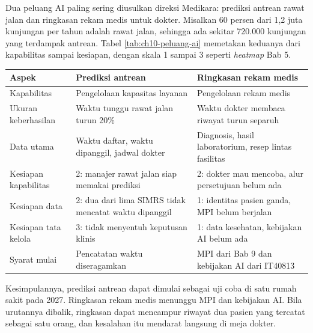 \begin{kasus}[title={Kasus Medikara Health: Dua Peluang AI}]
Dua peluang AI paling sering diusulkan direksi Medikara: prediksi antrean
rawat jalan dan ringkasan rekam medis untuk dokter. Misalkan 60 persen dari
1,2 juta kunjungan per tahun adalah rawat jalan, sehingga ada sekitar 720.000
kunjungan yang terdampak antrean. Tabel \ref{tab:ch10-peluang-ai} memetakan
keduanya dari kapabilitas sampai kesiapan, dengan skala 1 sampai 3 seperti
\textit{heatmap} Bab 5.

\begin{center}
  \small
  \label{tab:ch10-peluang-ai}
  \begin{tabularx}{\linewidth}{lXX}
    \hline
    \textbf{Aspek} & \textbf{Prediksi antrean} & \textbf{Ringkasan rekam medis} \\
    \hline
    Kapabilitas & Pengelolaan kapasitas layanan & Pengelolaan rekam medis \\
    \hline
    Ukuran keberhasilan & Waktu tunggu rawat jalan turun 20\% & Waktu dokter membaca riwayat turun separuh \\
    \hline
    Data utama & Waktu daftar, waktu dipanggil, jadwal dokter & Diagnosis, hasil laboratorium, resep lintas fasilitas \\
    \hline
    Kesiapan kapabilitas & 2: manajer rawat jalan siap memakai prediksi & 2: dokter mau mencoba, alur persetujuan belum ada \\
    \hline
    Kesiapan data & 2: dua dari lima SIMRS tidak mencatat waktu dipanggil & 1: identitas pasien ganda, MPI belum berjalan \\
    \hline
    Kesiapan tata kelola & 3: tidak menyentuh keputusan klinis & 1: data kesehatan, kebijakan AI belum ada \\
    \hline
    Syarat mulai & Pencatatan waktu diseragamkan & MPI dari Bab 9 dan kebijakan AI dari IT40813 \\
    \hline
  \end{tabularx}
\end{center}

Kesimpulannya, prediksi antrean dapat dimulai sebagai uji coba di satu rumah
sakit pada 2027. Ringkasan rekam medis menunggu MPI dan kebijakan AI. Bila
urutannya dibalik, ringkasan dapat mencampur riwayat dua pasien yang
tercatat sebagai satu orang, dan kesalahan itu mendarat langsung di meja
dokter.
\end{kasus}

